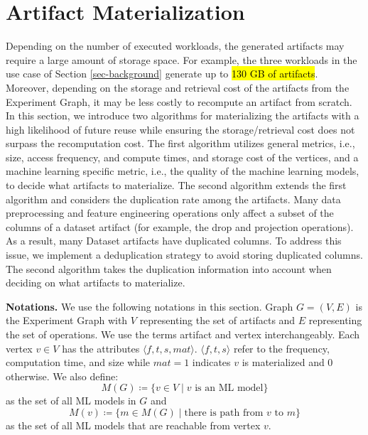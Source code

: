 \section{Artifact Materialization}\label{sec-materialization}
Depending on the number of executed workloads, the generated artifacts may require a large amount of storage space.
For example, the three workloads in the use case of Section \ref{sec-background} generate up to \hl{130 GB of artifacts}.
Moreover, depending on the storage and retrieval cost of the artifacts from the Experiment Graph, it may be less costly to recompute an artifact from scratch.
In this section, we introduce two algorithms for materializing the artifacts with a high likelihood of future reuse while ensuring the storage/retrieval cost does not surpass the recomputation cost.
The first algorithm utilizes general metrics, i.e., size, access frequency, and compute times, and storage cost of the vertices, and a machine learning specific metric, i.e., the quality of the machine learning models, to decide what artifacts to materialize.
The second algorithm extends the first algorithm and considers the duplication rate among the artifacts.
Many data preprocessing and feature engineering operations only affect a subset of the columns of a dataset artifact (for example, the drop and projection operations).
As a result, many Dataset artifacts have duplicated columns.
To address this issue, we implement a deduplication strategy to avoid storing duplicated columns.
The second algorithm takes the duplication information into account when deciding on what artifacts to materialize.

\textbf{Notations. }
We use the following notations in this section.
Graph $G = (V,E)$ is the Experiment Graph with $V$ representing the set of artifacts and $E$ representing the set of operations.
We use the terms artifact and vertex interchangeably.
Each vertex $v \in V$ has the attributes $\langle f, t, s, mat \rangle$.
$\langle f, t, s \rangle$ refer to the frequency, computation time, and size while $mat=1$ indicates $v$ is materialized and $0$ otherwise.
We also define:
\[M(G) \coloneqq  \{v \in V \mid v \text{ is an ML model}\}\] as the set of all ML models in $G$ and 
\[M(v) \coloneqq  \{m \in M(G) \mid\text{there is path from } v \text{ to } m\}\] as the set of all ML models that are reachable from vertex $v$.

